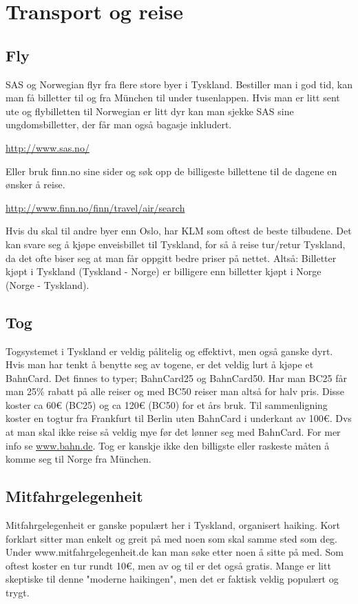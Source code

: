\chapter{Transport og reise}

\section{Fly}
SAS og Norwegian flyr fra flere store byer i Tyskland. Bestiller man i god tid, kan man få billetter til og fra München til under tusenlappen.
Hvis man er litt sent ute og flybilletten til Norwegian er litt dyr kan man sjekke SAS sine ungdomsbilletter, der får man også bagasje inkludert. 

\url{http://www.sas.no/}

Eller bruk finn.no sine sider og søk opp de billigeste billettene til de dagene en ønsker å reise. 

\url{http://www.finn.no/finn/travel/air/search}

Hvis du skal til andre byer enn Oslo, har KLM som oftest de beste tilbudene. Det kan svare seg å kjøpe enveisbillet til Tyskland, for så å reise tur/retur Tyskland, da det ofte biser seg at man får oppgitt bedre priser på nettet. Altså: Billetter kjøpt i Tyskland (Tyskland - Norge) er billigere enn billetter kjøpt i Norge (Norge - Tyskland).



\section{Tog}
Togsystemet i Tyskland er veldig pålitelig og effektivt, men også ganske dyrt. Hvis man har tenkt å benytte seg av togene, er det veldig lurt å kjøpe et BahnCard. Det finnes to typer; BahnCard25 og BahnCard50. Har man BC25 får man 25\% rabatt på alle reiser og med BC50 reiser man altså for halv pris. Disse koster ca 60\euro{} (BC25) og ca 120\euro{} (BC50) for et års bruk. Til sammenligning koster en togtur fra Frankfurt til Berlin uten BahnCard i underkant av 100\euro{}. Dvs at man skal ikke reise så veldig mye før det lønner seg med BahnCard. For mer info se \href{http://www.bahn.de}{www.bahn.de}.
Tog er kanskje ikke den billigste eller raskeste måten å komme seg til Norge fra München.


\section{Mitfahrgelegenheit}
Mitfahrgelegenheit er ganske populært her i Tyskland, organisert haiking. Kort forklart sitter man enkelt og greit på med noen som skal samme sted som deg. Under www.mitfahrgelegenheit.de kan man søke etter noen å sitte på med. Som oftest koster en tur rundt 10\euro{}, men av og til er det også gratis. Mange er litt skeptiske til denne "moderne haikingen", men det er faktisk veldig populært og trygt.

